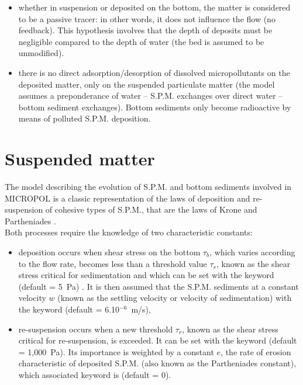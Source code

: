 \begin{itemize}
\item whether in suspension or deposited on the bottom, the matter is considered
  to be a passive tracer:
  in other words, it does not influence the flow (no feedback).
  This hypothesis involves that the depth of deposits must be negligible compared
  to the depth of water (the bed is assumed to be unmodified).
\item there is no direct adsorption/desorption of dissolved micropollutants
  on the deposited matter, only on the suspended particulate matter
  (the model assumes a preponderance of water – S.P.M. exchanges over direct water
  – bottom sediment exchanges).
  Bottom sediments only become radioactive by means of polluted S.P.M. deposition. 
\end{itemize}

\section{Suspended matter}

The model describing the evolution of S.P.M. and bottom sediments involved in MICROPOL
is a classic representation of the laws of deposition and re-suspension
of cohesive types of S.P.M., that are the laws of Krone \cite{krone_flume_1962}
and Partheniades \cite{partheniades_erosion_deposition_1965}.\\

Both processes require the knowledge of two characteristic constants:

\begin{itemize}
\item deposition occurs when shear stress on the bottom $\tau_b$,
  which varies according to the flow rate, becomes less than a threshold value $\tau_s$,
  known as the shear stress critical for sedimentation
  and which can be set with the keyword 
  (default = 5~Pa) .
  It is then assumed that the S.P.M. sediments at a constant velocity $w$
  (known as the settling velocity or velocity of sedimentation)
  with the keyword 
  (default = 6.10$^{-6}$~m/s),
\item re-suspension occurs when a new threshold $\tau_r$,
  known as the shear stress critical for re-suspension, is exceeded.
  It can be set with the keyword 
  (default = 1,000~Pa).
  Its importance is weighted by a constant $e$, the rate of erosion characteristic
  of deposited S.P.M. (also known as the Partheniades constant),
  which associated keyword is  (default = 0).
\end{itemize}

